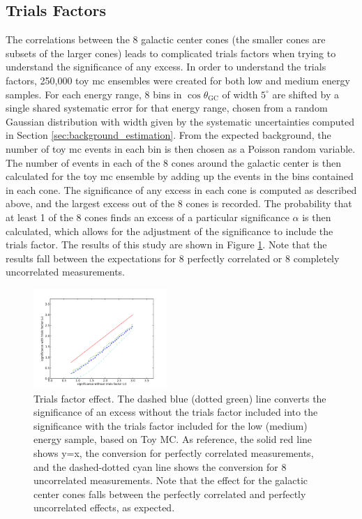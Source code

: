 \subsection{Trials Factors}
\label{sec:trials_factors}
The correlations between the 8 galactic center cones (the smaller cones are subsets of the larger cones) leads to complicated trials factors when trying to understand the significance of any excess.  In order to understand the trials factors, 250,000 toy mc ensembles were created for both low and medium energy samples.  For each energy range, 8 bins in $\cos \theta_{\textrm{GC}}$ of width $5^\circ$ are shifted by a single shared systematic error for that energy range, chosen from a random Gaussian distribution with width given by the systematic uncertainties computed in Section \ref{sec:background_estimation}.  From the expected background, the number of toy mc events in each bin is then chosen as a Poisson random variable.  The number of events in each of the 8 cones around the galactic center is then calculated for the toy mc ensemble by adding up the events in the bins contained in each cone.  The significance of any excess in each cone is computed as described above, and the largest excess out of the 8 cones is recorded.  The probability that at least 1 of the 8 cones finds an excess of a particular significance $\alpha$ is then calculated, which allows for the adjustment of the significance to include the trials factor.  The results of this study are shown in Figure \ref{fig:trials_factors}.    Note that the results fall between the expectations for 8 perfectly correlated or 8 completely uncorrelated measurements.

\begin{figure}
\includegraphics[width=0.45\textwidth]{figures/trial_factors.pdf}
\caption{Trials factor effect. The dashed blue (dotted green) line converts the significance of an excess without the trials factor included into the significance with the trials factor included for the low (medium) energy sample, based on Toy MC.  As reference, the solid red line shows y=x, the conversion for perfectly correlated measurements, and the dashed-dotted cyan line shows the conversion for 8 uncorrelated measurements.  Note that the effect for the galactic center cones falls between the perfectly correlated and perfectly uncorrelated effects, as expected.}
\label{fig:trials_factors}
\end{figure}   

